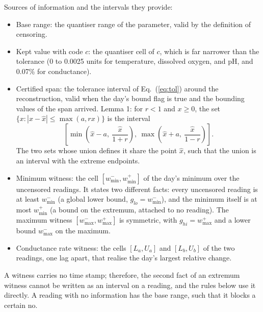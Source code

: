 Sources of information and the intervals they provide:
\begin{itemize}
  \item Base range: the quantiser range of the parameter, valid by the definition of censoring.
  \item Kept value with code $c$: the quantiser cell of $c$, which is far narrower than the tolerance (0 to 0.0025 units for temperature, dissolved oxygen, and pH, and 0.07\% for conductance).
  \item Certified span: the tolerance interval of Eq.~(\ref{eq:tol}) around the reconstruction, valid when the day's bound flag is true and the bounding values of the span arrived. Lemma 1: for $r < 1$ and $x \ge 0$, the set $\{x : |x - \hat{x}| \le \max(a, rx)\}$ is the interval
  \begin{equation}
  \left[\min\!\left(\hat{x} - a,\ \frac{\hat{x}}{1 + r}\right),\ \max\!\left(\hat{x} + a,\ \frac{\hat{x}}{1 - r}\right)\right].
  \label{eq:lemma1}
  \end{equation}
  The two sets whose union defines it share the point $\hat{x}$, such that the union is an interval with the extreme endpoints.
  \item Minimum witness: the cell $[w^{-}_{\min}, w^{+}_{\min}]$ of the day's minimum over the uncensored readings. It states two different facts: every uncensored reading is at least $w^{-}_{\min}$ (a global lower bound, $g_{lo} = w^{-}_{\min}$), and the minimum itself is at most $w^{+}_{\min}$ (a bound on the extremum, attached to no reading). The maximum witness $[w^{-}_{\max}, w^{+}_{\max}]$ is symmetric, with $g_{hi} = w^{+}_{\max}$ and a lower bound $w^{-}_{\max}$ on the maximum.
  \item Conductance rate witness: the cells $[L_a, U_a]$ and $[L_b, U_b]$ of the two readings, one lag apart, that realise the day's largest relative change.
\end{itemize}
A witness carries no time stamp; therefore, the second fact of an extremum witness cannot be written as an interval on a reading, and the rules below use it directly. A reading with no information has the base range, such that it blocks a certain no.

